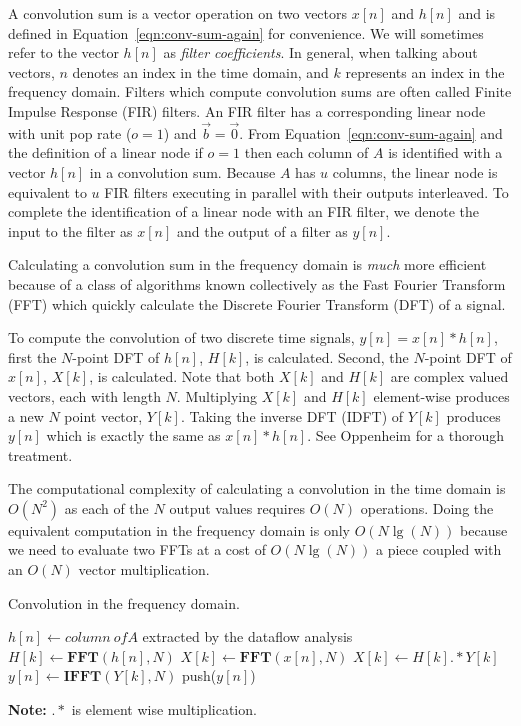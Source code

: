 A convolution sum is a vector operation on two vectors $x[n]$ and 
$h[n]$ and is defined in Equation~\ref{eqn:conv-sum-again} for
convenience. We will sometimes refer to the vector $h[n]$ as 
{\it filter coefficients}. In general, when talking about vectors, $n$ denotes 
an index in the time domain, and $k$ represents an index in the 
frequency domain. Filters which compute convolution sums are often called 
Finite Impulse Response (FIR) filters. An FIR filter has a corresponding linear 
node with unit pop rate ($o=1$) and ${\vec b} = {\vec 0}$. From 
Equation~\ref{eqn:conv-sum-again} and the definition of a linear node
if $o=1$ then each column of $A$ is identified with a vector $h[n]$
in a convolution sum. Because $A$ has $u$ columns,	
the linear node is equivalent to $u$ FIR filters 
executing in parallel with their outputs interleaved.
To complete the identification of a linear node with an FIR filter,
we denote the input to the filter as $x[n]$ and the output of
a filter as $y[n]$.

Calculating a convolution sum in the frequency domain is {\it much}
more efficient because of a class of algorithms known collectively as 
the Fast Fourier Transform (FFT) which quickly calculate 
the Discrete Fourier Transform (DFT) of a signal.

To compute the convolution of two discrete time signals, $y[n]=x[n]*h[n]$,
first the $N$-point DFT of $h[n]$, $H[k]$, is calculated.
Second, the $N$-point DFT of $x[n]$, $X[k]$, is calculated.
Note that both $X[k]$ and $H[k]$ are complex valued vectors, each with 
length $N$. Multiplying $X[k]$ and $H[k]$ element-wise produces a new $N$ point
vector, $Y[k]$. Taking the inverse DFT (IDFT) of $Y[k]$ produces 
$y[n]$ which is exactly the same as $x[n]*h[n]$. See Oppenheim
\cite{oppenheim-discrete} for a thorough treatment.

The computational complexity of calculating a convolution in the time domain
is $O(N^2)$ as each of the $N$ output values requires $O(N)$ operations.
Doing the equivalent computation in the frequency domain 
is only $O(N \lg(N))$ because we need to evaluate two FFTs at a cost of
$O(N \lg(N))$ a piece coupled with an $O(N)$ vector multiplication.

\begin{algorithm}
  \caption{Convolution in the frequency domain.\label{alg:freq-overview}}
  \begin{algorithmic}
    \STATE $h[n] \leftarrow {\mathit column~of}A$ extracted by the dataflow analysis
    \STATE $H[k] \leftarrow \mathbf{FFT}(h[n],N)$ 
      \STATE $X[k] \leftarrow \mathbf{FFT}(x[n],N)$
      \STATE $X[k] \leftarrow H[k] .* Y[k]$ 
      \STATE $y[n] \leftarrow \mathbf{IFFT}(Y[k],N)$
      \STATE push($y[n]$)
    \ENDWHILE
  \end{algorithmic}
  {\bf Note:} $.*$ is element wise multiplication.
\end{algorithm}

